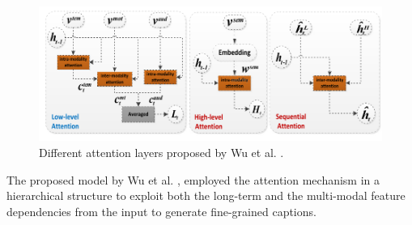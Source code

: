 \documentclass[preprint, 10pt]{elsarticle}
\begin{document}
	
%		
		\begin{figure}[H]
			\centering
			\includegraphics[scale=0.4]{Imgs/attentions.png}
			\caption{Different attention layers proposed by Wu et al. \cite{wu2018hierarchical}.}
			\label{fig:attnss}
		\end{figure}
	
	The proposed model by Wu et al. \cite{wu2018hierarchical}, employed the attention mechanism in a hierarchical structure to exploit both the long-term and the multi-modal feature dependencies from the input to generate fine-grained captions.
		
\end{document}
